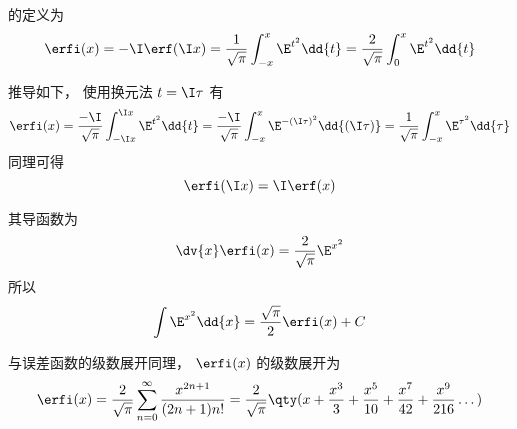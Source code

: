 
的定义为
\begin{equation}
\erfi(x) = -\I \erf(\I x) = \frac{1}{\sqrt{\pi}} \int_{-x}^x \E^{t^2} \dd{t}
= \frac{2}{\sqrt{\pi}} \int_0^x \E^{t^2} \dd{t}
\end{equation}

推导如下， 使用换元法 $t = \I \tau$ 有
\begin{equation}
\erfi(x) = \frac{-\I}{\sqrt{\pi}} \int_{-\I x}^{\I x} \E^{t^2} \dd{t}
= \frac{-\I}{\sqrt{\pi}} \int_{-x}^{x} \E^{-(\I \tau)^2} \dd{(\I \tau)}
= \frac{1}{\sqrt{\pi}} \int_{-x}^{x} \E^{\tau^2} \dd{\tau}
\end{equation}
同理可得
\begin{equation}
\erfi(\I x) = \I \erf(x)
\end{equation}

其导函数为
\begin{equation}
\dv{x} \erfi(x) = \frac{2}{\sqrt{\pi}} \E^{x^2}
\end{equation}
所以
\begin{equation}
\int \E^{x^2} \dd{x} = \frac{\sqrt{\pi}}{2} \erfi(x) + C
\end{equation}

与误差函数的级数展开同理， $\erfi(x)$ 的级数展开为
\begin{equation}
\erfi(x) = \frac{2}{\sqrt{\pi}} \sum_{n=0}^\infty \frac{x^{2n+1}}{(2n+1)n!}
= \frac{2}{\sqrt{\pi}}\qty(x + \frac{x^3}{3} + \frac{x^5}{10} + \frac{x^7}{42} + \frac{x^9}{216} \dots)
\end{equation}